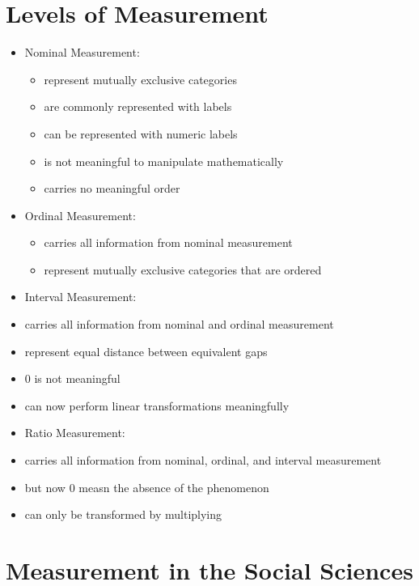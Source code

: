 \documentclass[12pt]{article}
\begin{document}
\section{Levels of Measurement}\label{levels-of-measurement}

\begin{itemize}
\itemsep1pt\parskip0pt
\item
  Nominal Measurement:

  \begin{itemize}
  \itemsep1pt\parskip0pt
  \item
    represent mutually exclusive categories
  \item
    are commonly represented with labels
  \item
    can be represented with numeric labels
  \item
    is not meaningful to manipulate mathematically
  \item
    carries no meaningful order
  \end{itemize}
\item
  Ordinal Measurement:

  \begin{itemize}
  \itemsep1pt\parskip0pt
  \item
    carries all information from nominal measurement
  \item
    represent mutually exclusive categories that are ordered
  \end{itemize}
\item
  Interval Measurement:
\item
  carries all information from nominal and ordinal measurement
\item
  represent equal distance between equivalent gaps
\item
  0 is not meaningful
\item
  can now perform linear transformations meaningfully
\item
  Ratio Measurement:
\item
  carries all information from nominal, ordinal, and interval
  measurement
\item
  but now 0 measn the absence of the phenomenon
\item
  can only be transformed by multiplying
\end{itemize}

\section{Measurement in the Social
Sciences}\label{measurement-in-the-social-sciences}
\end{document}
